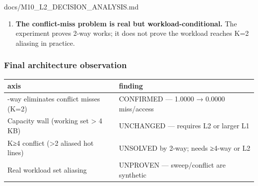 \begin{relocated}{docs/M10_L2_DECISION_ANALYSIS.md}
\begin{enumerate}
  \begin{itemize}
  \tightlist
  \item
    Small scalar kernels (boot, peripheral drivers, interrupt handlers):
    working set typically \textless{} 512 B → all in L1, zero misses
    regardless of WAYS.
  \item
    -class loops with two large arrays: both arrays may
    alias the same sets, making this a real concern. But the GPU handles
    bulk data-parallel work.
  \item
    Memory-scanning loops (boot ROM copy, DMA setup): stride-based, not
    aliasing.
  \end{itemize}
\item
  \textbf{The conflict-miss problem is real but workload-conditional.}
  The experiment proves 2-way works; it does not prove the workload
  reaches K=2 aliasing in practice.
\end{enumerate}

\subsubsection{Final architecture observation}\label{tm:dec:m10-l2:74-final-architecture-observation}

{
\begin{longtable}[]{@{}
  >{\raggedright\arraybackslash}p{}
  >{\raggedright\arraybackslash}p{}@{}}
\toprule\noalign{}
\begin{minipage}[b]{\linewidth}\raggedright
axis
\end{minipage} & \begin{minipage}[b]{\linewidth}\raggedright
finding
\end{minipage} \\
\midrule\noalign{}
\endhead
\bottomrule\noalign{}
\endlastfoot
2-way eliminates conflict misses (K=2) & CONFIRMED --- 1.0000 → 0.0000
miss/\allowbreak{}access \\
Capacity wall (working set \textgreater{} 4 KB) & UNCHANGED --- requires
L2 or larger L1 \\
K≥4 conflict (\textgreater2 aliased hot lines) & UNSOLVED by 2-way;
needs ≥4-way or L2 \\
Real workload set aliasing & UNPROVEN --- sweep/\allowbreak{}conflict
are synthetic \\
\end{longtable}
}


\end{relocated}

